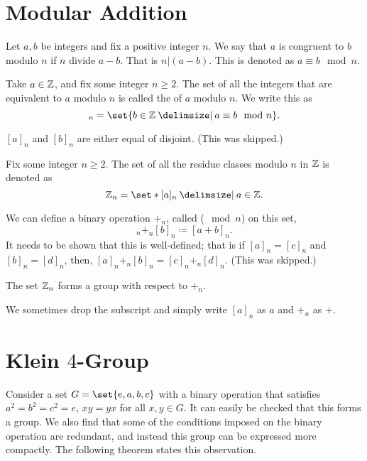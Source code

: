 \documentclass[11pt]{penrose}
\begin{document}
\section{Modular Addition}

\begin{ndfn}
    Let $a, b$ be integers and fix a positive integer $n$. We say that $a$ is congruent to $b$ modulo $n$ if $n$ divide $a-b$. That is $n | (a-b)$. This is denoted as $a \equiv b \mod n$.
\end{ndfn}

\begin{ndfn}
    Take $a \in \mathbb{Z}$, and fix some integer $n \geq 2$. The set of all the integers that are equivalent to $a$ modulo $n$ is called the  of $a$ modulo $n$. We write this as
    \begin{equation*}
        [a]_n = \set{b \in \Z \st a \equiv b \mod n}.
    \end{equation*}
\end{ndfn}

\begin{remark}
    $[a]_n$ and $[b]_n$ are either equal of disjoint. (This was skipped.)
\end{remark}

\begin{ndfn}
    Fix some integer $n \geq 2$. The set of all the residue classes modulo $n$ in $\mathbb{Z}$ is denoted as
    \begin{equation*}
        \Z_n = \set*{[a]_n \st a \in \Z}.
    \end{equation*}
\end{ndfn}

We can define a binary operation $+_n$, called  ($\mod n$) on this set,
\begin{equation*}
    [a]_n +_n [b]_n \coloneq [a + b]_n.
\end{equation*}
It needs to be shown that this is well-defined; that is if $[a]_n = [c]_n$ and $[b]_n = [d]_n$, then, $[a]_n +_n [b]_n = [c]_n +_n [d]_n$. (This was skipped.)

\begin{nthm}
    The set $\mathbb{Z}_n$ forms a group with respect to $+_n$.
\end{nthm}

We sometimes drop the subscript and simply write $[a]_n$ as $a$ and $+_n$ as $+$.

\section{\texorpdfstring{Klein $4$-Group}{Klein 4 Group}}
Consider a set $G = \set{e, a, b, c}$ with a binary operation that satisfies $a^2 = b^2 = c^2 = e$, $xy = yx$ for all $x, y \in G$. It can easily be checked that this forms a group. We also find that some of the conditions imposed on the binary operation are redundant, and instead this group can be expressed more compactly. The following theorem states this observation.
\end{document}
